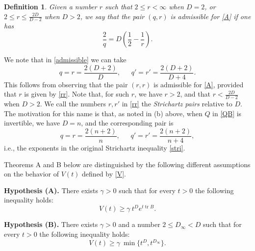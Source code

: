 \documentclass[11pt,letter]{amsart}
\numberwithin{equation}{section}
\newcommand{\tr}{\operatorname{tr}}
\newtheorem{definition}[theorem]{Definition}
\numberwithin{equation}{section}
\begin{document}
\begin{definition}\label{D:admissible}
Given a number $r$ such that $2\le r < \infty$ when $D = 2$, or 
$2\le r \le \frac{2D}{D-2}$ when $D> 2$, 
we say that the pair $(q,r)$ is \emph{admissible} for \eqref{A} if one has
\begin{equation}\label{admissible}
\frac 2q = D\left(\frac 12 - \frac 1r\right).
\end{equation}
\end{definition}

\medskip

\noindent We note that in \eqref{admissible} we can take 
 \begin{equation}\label{rr}
q = r = \frac{2(D+2)}D,\ \ \ \ \ \ \ q' = r' = \frac{2(D+2)}{D+4}.
\end{equation}
This follows from observing that the pair $(r,r)$ is admissible for \eqref{A}, provided that $r$ is given by \eqref{rr}. Note that, for such $r$, we have $r>2$, and that $r<\frac{2D}{D-2}$ when $D>2$. We call the numbers $r, r'$ in \eqref{rr} the \emph{Strichartz pairs} relative to $D$. The motivation for this name is that, as noted in (b) above, when $Q$ in \eqref{QB} is invertible, we have $D = n$, and the corresponding pair is 
\begin{equation}\label{stripairn}
q = r = \frac{2(n+2)}n,\ \ \ \ \ \ \ q' = r' = \frac{2(n+2)}{n+4},
\end{equation}
i.e., the exponents in the original Strichartz inequality \eqref{stri}. 


\vskip 0.2in


Theorems A and B below are distinguished by the following different assumptions on the behavior of $V(t)$ defined by \eqref{V}.

\vskip 0.2in

\noindent \textbf{Hypothesis (A).} There exists $\gamma>0$ such that for every $t> 0$ the following inequality holds:
\begin{equation}\label{H0}
V(t) \ge \gamma\ t^{D} e^{t \tr B}.
\end{equation}

\vskip 0.2in

\noindent \textbf{Hypothesis (B).} There exists $\gamma>0$ and a number $2\le D_\infty<D$ such that for every $t> 0$ the following inequality holds:
\begin{equation}\label{HB}
V(t) \ge \gamma\ \min\{t^{D}, t^{D_\infty}\}.
\end{equation}

\vskip 0.2in
\end{document}
